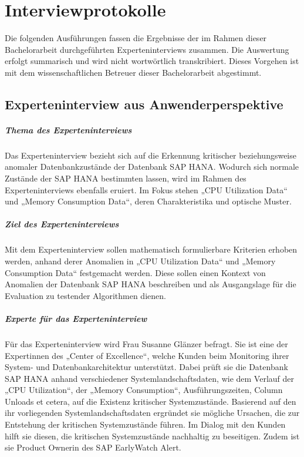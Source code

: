 \chapter{Interviewprotokolle}
Die folgenden Ausführungen fassen die Ergebnisse der im Rahmen dieser Bachelorarbeit durchgeführten Experteninterviews zusammen. Die Auswertung erfolgt summarisch und wird nicht wortwörtlich transkribiert. Dieses Vorgehen ist mit dem wissenschaftlichen Betreuer dieser Bachelorarbeit abgestimmt.

\section{Experteninterview aus Anwenderperspektive}
\paragraph{Thema des Experteninterviews}
Das Experteninterview bezieht sich auf die Erkennung kritischer beziehungsweise anomaler Datenbankzustände der Datenbank SAP HANA. Wodurch sich normale Zustände der SAP HANA bestimmten lassen, wird im Rahmen des Experteninterviews ebenfalls eruiert. Im Fokus stehen „CPU Utilization Data“ und „Memory Consumption Data“, deren Charakteristika und optische Muster.

\paragraph{Ziel des Experteninterviews}
Mit dem Experteninterview sollen mathematisch
formulierbare Kriterien erhoben werden, anhand derer Anomalien in „CPU Utilization Data“ und „Memory Consumption Data“ festgemacht werden. Diese sollen einen Kontext von Anomalien der Datenbank SAP HANA beschreiben und als Ausgangslage für die Evaluation zu testender Algorithmen dienen.

\paragraph{Experte für das Experteninterview}
 Für das Experteninterview wird Frau Susanne Glänzer befragt. Sie ist eine der Expertinnen des „Center of Excellence“, welche Kunden beim Monitoring ihrer System- und Datenbankarchitektur unterstützt. Dabei prüft sie die Datenbank SAP HANA anhand verschiedener Systemlandschaftsdaten, wie dem Verlauf der „CPU Utilization“, der „Memory Consumption“, Ausführungszeiten, Column Unloads et cetera, auf die Existenz kritischer Systemzustände. Basierend auf den ihr vorliegenden Systemlandschaftsdaten ergründet sie mögliche Ursachen, die zur Entstehung der kritischen Systemzustände führen. Im Dialog mit den Kunden hilft sie diesen, die kritischen Systemzustände nachhaltig zu beseitigen. Zudem ist sie Product Ownerin des SAP EarlyWatch Alert.
 
